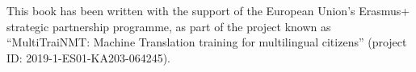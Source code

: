 \addchap{\lsAcknowledgementTitle}

\begin{sloppypar}
This book has been written with the support of the European Union's Erasmus+ strategic partnership programme, as part of the project known as “\mbox{MultiTraiNMT}: Machine Translation training for multilingual citizens” (project ID: 2019-1-ES01-KA203-064245).
\end{sloppypar}
